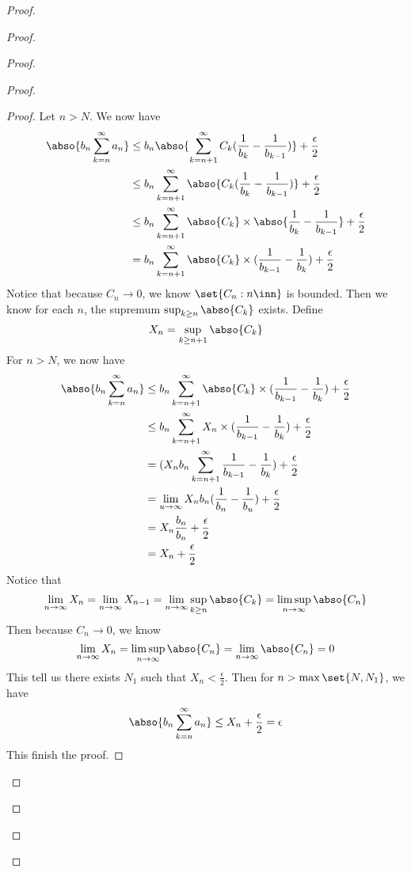 \documentclass{report}
\begin{document}
\begin{proof}
\begin{proof}
\begin{proof}
\begin{proof}
\begin{proof}
Let $n>N$. We now have
 \begin{align*}
   \abso{b_n\sum_{k=n}^\infty a_n}&\leq b_n\abso{\sum_{k=n+1}^\infty C_k(\frac{1}{b_k}-\frac{1}{b_{k-1}})}+\frac{\epsilon}{2}\\
&\leq b_n\sum_{k=n+1}^\infty \abso{C_k(\frac{1}{b_k}-\frac{1}{b_{k-1}})}+\frac{\epsilon}{2}\\
&\leq b_n\sum_{k=n+1}^\infty \abso{C_k} \times\abso{\frac{1}{b_k}-\frac{1}{b_{k-1}}}+\frac{\epsilon}{2}\\
&= b_n\sum_{k=n+1}^\infty \abso{C_k}\times (\frac{1}{b_{k-1}}-\frac{1}{b_k})+\frac{\epsilon}{2}
\end{align*}
Notice that because $C_n\to 0$, we know  $\set{C_n:n\inn}$ is bounded. Then we know for each $n$, the supremum  $\sup_{k\geq n} \abso{C_k}$ exists. Define
\begin{equation*}
X_n=\sup_{k\geq n+1}\abso{C_k}
\end{equation*}
For $n>N$, we now have
 \begin{align*}
   \abso{b_n\sum_{k=n}^\infty a_n}&\leq b_n\sum_{k=n+1}^\infty \abso{C_k}\times (\frac{1}{b_{k-1}}-\frac{1}{b_k})+\frac{\epsilon}{2}\\
                                  &\leq b_n\sum_{k=n+1}^\infty X_n \times (\frac{1}{b_{k-1}}-\frac{1}{b_k})+\frac{\epsilon}{2}\\
   &=(X_nb_n\sum_{k=n+1}^\infty \frac{1}{b_{k-1}}-\frac{1}{b_k}) +\frac{\epsilon}{2}\\
   &=\lim_{u\to\infty} X_nb_n (\frac{1}{b_n}-\frac{1}{b_u})+\frac{\epsilon}{2}\\
   &=X_n \frac{b_n}{b_n}+\frac{\epsilon}{2}\\
   &=X_n+\frac{\epsilon}{2}
\end{align*}
Notice that 
\begin{equation*}
\lim_{n\to\infty}X_n=\lim_{n\to\infty}X_{n-1}=\lim_{n\to\infty}\sup_{k\geq n}\abso{C_k}=\limsup_{n\to\infty} \abso{C_n}
\end{equation*}
Then because $C_n\to 0$, we know 
 \begin{equation*}
\lim_{n\to\infty}X_n=\limsup_{n\to\infty} \abso{C_n}=\lim_{n\to\infty}\abso{C_n}=0
\end{equation*}
This tell us there exists $N_1$ such that  $X_n<\frac{\epsilon}{2}$. Then for $n>\max \set{N,N_1}$, we have
\begin{equation*}
\abso{b_n\sum_{k=n}^\infty a_n}\leq X_n+\frac{\epsilon}{2}=\epsilon 
\end{equation*}
This finish the proof. 

\end{proof}
\end{proof}
\end{proof}
\end{proof}
\end{proof}
\end{document}
